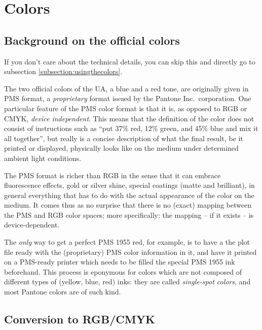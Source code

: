 \section{Colors}

\subsection{Background on the official colors}

\begin{note}
If you don't care about the technical details, you can skip this and directly go to subsection \ref{subsection:usingthecolors}.
\end{note}

The two official colors of the UA, a blue and a red tone, are originally given in PMS format, a \emph{proprietary} format issued by the Pantone Inc.\ corporation. One particular feature of the PMS color format is that it is, as opposed to RGB or CMYK, \emph{device independent}. This means that the definition of the color does not consist of instructions such as \enquote{put 37\% red, 12\% green, and 45\% blue and mix it all together}, but really is a concise description of what the final result, be it printed or displayed, physically looks like on the medium under determined ambient light conditions.

The PMS format is richer than RGB in the sense that it can embrace fluorescence effects, gold or silver shine, special coatings (matte and brilliant), in general everything that has to do with the actual appearance of the color on the medium. It comes thus as no surprise that there is no (exact) mapping between the PMS and RGB color spaces; more specifically: the mapping -- if it exists -- is device-dependent.

The \emph{only} way to get a perfect PMS 1955 red, for example, is to have a the plot file ready with the (proprietary) PMS color information in it, and have it printed on a PMS-ready printer which needs to be filled the special PMS 1955 ink beforehand. This process is eponymous for colors which are not composed of different types of (yellow, blue, red) inks: they are called \emph{single-spot colors}, and most Pantone\textsuperscript{\textregistered} colors are of such kind.


\subsection{Conversion to RGB/CMYK}

